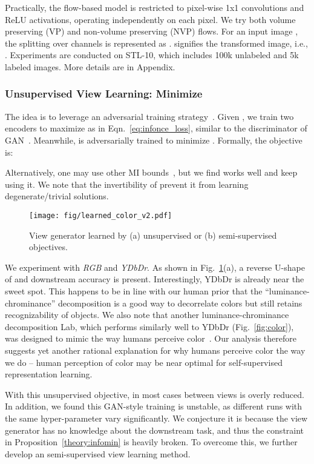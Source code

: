 \documentclass{article}
\begin{document}
Practically, the flow-based model  is restricted to pixel-wise 1x1 convolutions and ReLU activations, operating independently on each pixel. We try both volume preserving (VP) and non-volume preserving (NVP) flows. For an input image , the splitting over channels is represented as .  signifies the transformed image, i.e., . Experiments are conducted on STL-10, which includes 100k unlabeled and 5k labeled images. More details are in Appendix.

\subsubsection{Unsupervised View Learning: Minimize }

The idea is to leverage an adversarial training strategy~\cite{goodfellow2014generative}. Given , we train two encoders  to maximize  as in Eqn.~\ref{eq:infonce_loss}, similar to the discriminator of GAN~\cite{goodfellow2014generative}. Meanwhile,  is adversarially trained to minimize . Formally, the objective is:

Alternatively, one may use other MI bounds~\cite{belghazi2018mine,poole2019variational}, but we find  works well and keep using it. We note that the invertibility of  prevent it from learning degenerate/trivial solutions.

\begin{figure}[t]
\centering
\texttt{[image: fig/learned\_color\_v2.pdf]}
\caption{View generator learned by (a) unsupervised or (b) semi-supervised objectives.}
\label{fig:learned_color}
\end{figure}
 
 We experiment with \emph{RGB} and \emph{YDbDr}. As shown in Fig.~\ref{fig:learned_color}(a), a reverse U-shape of  and downstream accuracy is present. Interestingly, YDbDr is already near the sweet spot. 
This happens to be in line with our human prior that the ``luminance-chrominance'' decomposition is a good way to decorrelate colors but still retains recognizability of objects.
We also note that another luminance-chrominance decomposition Lab, which performs similarly well to YDbDr (Fig.~\ref{fig:color}), was designed to mimic the way humans perceive color~\cite{jain1989fundamentals}. Our analysis therefore suggests yet another rational explanation for why humans perceive color the way we do -- human perception of color may be near optimal for self-supervised representation learning.

With this unsupervised objective, in most cases  between views is overly reduced. In addition, we found this GAN-style training is unstable, as different runs with the same hyper-parameter vary significantly. We conjecture it is because the view generator has no knowledge about the downstream task, and thus the constraint  in Proposition~\ref{theory:infomin} is heavily broken.
To overcome this, we further develop an semi-supervised view learning method.
\end{document}
